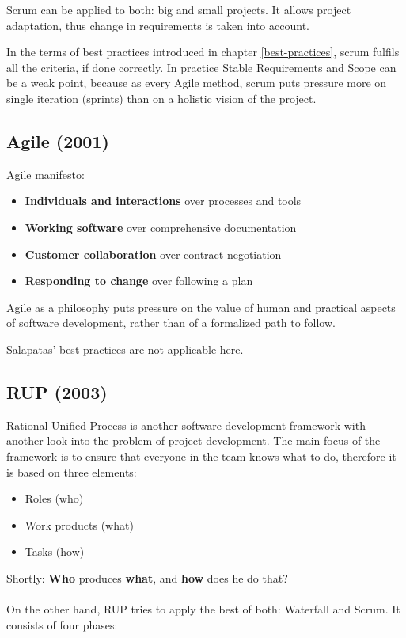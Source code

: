 Scrum can be applied to both: big and small projects. It allows project
adaptation, thus change in requirements is taken into account.

In the terms of best practices introduced in chapter \ref{best-practices}, scrum fulfils all the criteria, if done correctly. In practice Stable Requirements and Scope can be a weak point, because as every Agile method, scrum puts pressure more on single iteration (sprints) than on a holistic vision of the project.

\subsection{Agile (2001)}\label{agile}

Agile manifesto\cite{fowler2001agile}:

\begin{itemize}
\item
  \textbf{Individuals and interactions} over processes and tools
\item
  \textbf{Working software} over comprehensive documentation
\item
  \textbf{Customer collaboration} over contract negotiation
\item
  \textbf{Responding to change} over following a plan
\end{itemize}

Agile as a philosophy puts pressure on the value of human and practical aspects of software development, rather than of a formalized path to follow. 

Salapatas' best practices are not applicable here.

\subsection{RUP (2003)}\label{rup}

Rational Unified Process is another software development framework with another look into the problem of project development. The main focus of the framework is to ensure that everyone in the team knows what to do, therefore it is based on three elements:

\begin{itemize}
\item
  Roles (who)
\item
  Work products (what)
\item
  Tasks (how)
\end{itemize}

Shortly: \textbf{Who} produces \textbf{what}, and \textbf{how} does he
do that?\cite{wiki:Rational_Unified_Process}\cite{powell-morse_2017}
\\\\
On the other hand, RUP tries to apply the best of both: Waterfall and
Scrum. It consists of four phases:

